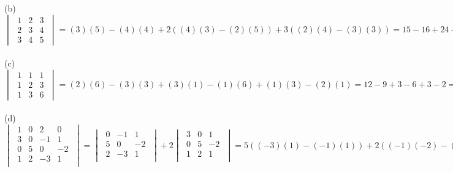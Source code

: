 \documentclass[10pt]{extarticle}
\begin{document}
\begin{itemize}
		
		(b) $\begin{vmatrix}
				\; 1 & 2 & 3 \;\\
				\; 2 & 3 & 4 \; \\
				\; 3 & 4 & 5\;
			\end{vmatrix}
			=(3)(5)-(4)(4)+2((4)(3)-(2)(5))+3((2)(4)-(3)(3))=15-16+24-20+24-27=0$\\ \\
		
		
		(c) $\begin{vmatrix}
				\; 1 & 1 & 1 \;\\
				\; 1 & 2 & 3 \; \\
				\; 1 & 3 & 6\;
			\end{vmatrix}
			=(2)(6)-(3)(3)+(3)(1)-(1)(6)+(1)(3)-(2)(1)=12-9+3-6+3-2=1$ \\ \\ 
			
			
		(d) $\begin{vmatrix}
				\; 1 & 0 & 2 & 0  \;\\
				\; 3 & 0 & -1 & 1 \;\\
				\; 0 & 5 & 0 & -2  \;\\
				\; 1 & 2 & -3 & 1  \;\\
			\end{vmatrix}
			=\begin{vmatrix}
				\;  0 & -1 & 1 \;\\
				\; 5 & 0 & -2  \;\\
				\; 2 & -3 & 1  \;\\
				\end{vmatrix}+2
			\begin{vmatrix}
				\; 3 & 0 & 1 \;\\
				\; 0 & 5 & -2  \;\\
				\; 1 & 2 & 1  \;\\
			\end{vmatrix}=5((-3)(1)-(-1)(1))+2((-1)(-2)-(0)(1))+2(3((5)(1)-(-2)(2))+(0)(-2)-(5)(1))=5(-2)+2(2)+2(27-5)=38$ \\ \\
			

\end{itemize}
\end{document}
